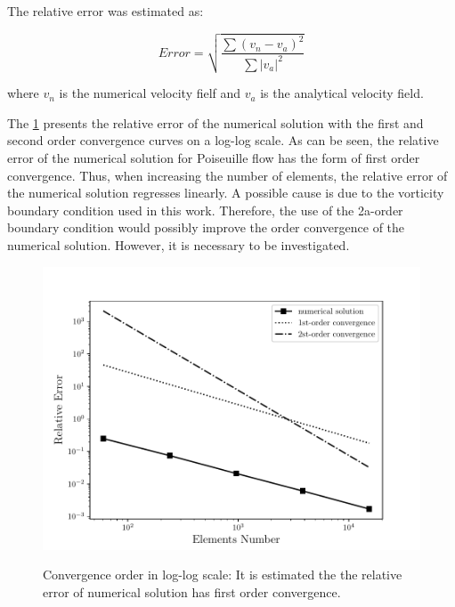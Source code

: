 \noindent
\medskip
The relative error was estimated as:

\begin{equation}
 \mathit{Error} = \sqrt{\frac{\sum{(v_{n} - v_{a})^{2} }}{\sum |v_{a}|^{2} }}
\end{equation}

\noindent
where $v_{n}$ is the numerical velocity fielf and
$v_{a}$ is the analytical velocity field.

\bigskip
The \ref{ordem de convergencia poiseuille} presents the relative error 
of the numerical solution with the first and second order convergence 
curves on a log-log scale. As can be seen, the relative error of 
the numerical solution for Poiseuille flow has the form of 
first order convergence. Thus, when increasing the number of elements, 
the relative error of the numerical solution regresses linearly.
A possible cause is due to the vorticity boundary condition used 
in this work. Therefore, the use of the 2a-order boundary condition
would possibly improve the order convergence of the numerical
solution. However, it is necessary to be investigated. 


\begin{figure}[H]
     \caption{Convergence order in log-log scale:
It is estimated the the relative error of numerical solution has
first order convergence.}
     \centering
     \includegraphics[scale=1]{./02_chaps/cap_validation/figure/poiseuille_error.pdf}\\
     \medskip
     \label{ordem de convergencia poiseuille}
\end{figure}


